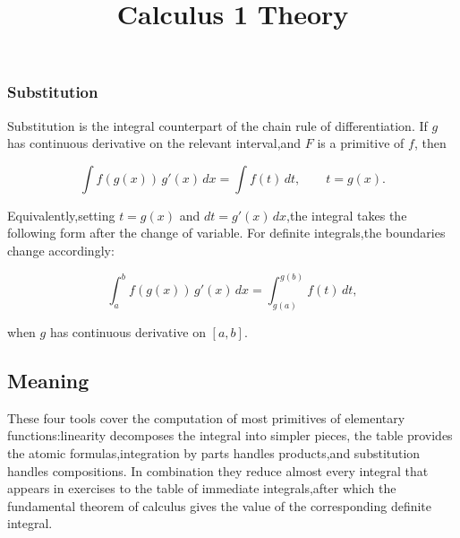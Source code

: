\documentclass[11pt,a4paper]{article} \usepackage[T1]{fontenc}
\theoremstyle{plain} \newtheorem{theorem}{Theorem} \title{Calculus 1 Theory}
\begin{document}
\subsubsection {Substitution}

Substitution is the integral counterpart of the chain rule of differentiation.
If $g$ has continuous derivative on the relevant interval,and $F$ is a
primitive of $f$, then

\[
\int f(g(x))\,g'(x)\,dx = \int f(t)\,dt,\qquad t=g(x).
\]

Equivalently,setting $t=g(x)$ and $dt=g'(x)\,dx$,the integral takes the
following form after the change of variable. For definite integrals,the
boundaries change accordingly:

\[
\int_a^b f(g(x))\,g'(x)\,dx = \int_{g(a)}^{g(b)} f(t)\,dt,
\]

when $g$ has continuous derivative on $[a,b]$.

\subsection*{Meaning}

These four tools cover the computation of most primitives of elementary
functions:linearity decomposes the integral into simpler pieces, the table
provides the atomic formulas,integration by parts handles products,and
substitution handles compositions. In combination they reduce almost every
integral that appears in exercises to the table of immediate integrals,after
which the fundamental theorem of calculus gives the value of the corresponding
definite integral.
\end{document}
